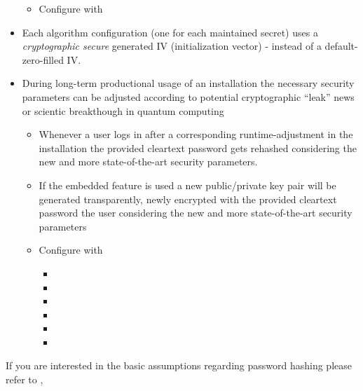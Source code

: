 \begin{itemize}
\begin{itemize}
			\item Configure with 
		\end{itemize}
	\item Each algorithm configuration (one for each maintained secret) uses a \textit{cryptographic secure} generated IV (initialization vector) - instead of a default-zero-filled IV.
	\item During long-term productional usage of an \AMBETH{} installation the necessary security parameters can be adjusted according to potential cryptographic ``leak'' news or scientic breakthough in quantum computing
		\begin{itemize}
			\item Whenever a user logs in after a corresponding runtime-adjustment in the \AMBETH{} installation the provided cleartext password gets rehashed considering the new and more state-of-the-art security parameters.
			\item If the embedded  feature is used a new public/private key pair will be generated transparently, newly encrypted with the provided cleartext password the user considering the new and more state-of-the-art security parameters
			\item Configure with
				\begin{itemize}
					\item {}
					\item {}
					\item {}
					\item {}
					\item {}
					\item {}
				\end{itemize}	
		\end{itemize}	
\end{itemize}

If you are interested in the basic assumptions regarding password hashing please refer to \cite{lka01}, 



